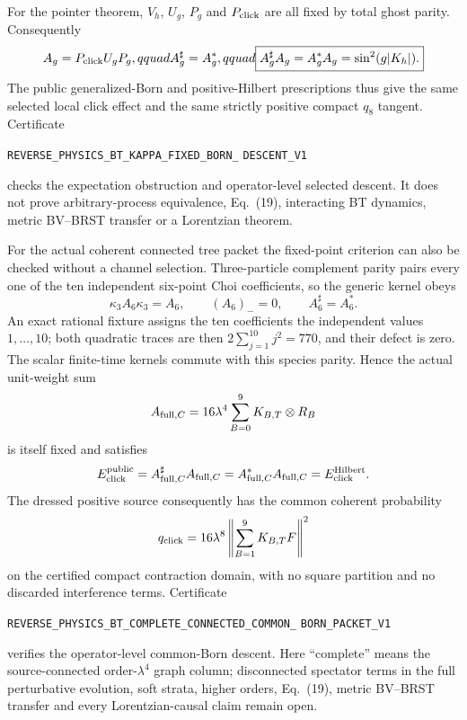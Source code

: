 \documentclass[11pt]{article}
\theoremstyle{definition}
\theoremstyle{remark}
\begin{document}
For the pointer theorem, $V_h$, $U_g$, $P_g$ and $P_{\rm click}$ are all
fixed by total ghost parity.  Consequently
\[
 A_g=P_{\rm click}U_gP_g,qquad A_g^\sharp=A_g^*,qquad
 \boxed{A_g^\sharp A_g=A_g^*A_g=\sin^2(g|K_h|).}
\]
The public generalized-Born and positive-Hilbert prescriptions thus give the
same selected local click effect and the same strictly positive compact
$q_8$ tangent.  Certificate
\par\noindent
\texttt{REVERSE\_PHYSICS\_BT\_KAPPA\_FIXED\_BORN\_}
\allowbreak\texttt{DESCENT\_V1}
\par\noindent
checks the expectation obstruction and operator-level selected descent.  It
does not prove arbitrary-process equivalence, Eq.~(19), interacting BT
dynamics, metric BV--BRST transfer or a Lorentzian theorem.

For the actual coherent connected tree packet the fixed-point criterion can
also be checked without a channel selection.  Three-particle complement
parity pairs every one of the ten independent six-point Choi coefficients,
so the generic kernel obeys
\[
 \kappa_3A_6\kappa_3=A_6,\qquad (A_6)_-=0,
 \qquad A_6^\sharp=A_6^*.
\]
An exact rational fixture assigns the ten coefficients the independent
values $1,\ldots,10$; both quadratic traces are then
$2\sum_{j=1}^{10}j^2=770$, and their defect is zero.  The scalar finite-time
kernels commute with this species parity.  Hence the actual unit-weight sum
\[
 A_{{\rm full},C}=16\lambda^4\sum_{B=0}^{9}K_{B,T}\otimes R_B
\]
is itself fixed and satisfies
\[
 E_{\rm click}^{\rm public}
 =A_{{\rm full},C}^\sharp A_{{\rm full},C}
 =A_{{\rm full},C}^* A_{{\rm full},C}
 =E_{\rm click}^{\rm Hilbert}.
\]
The dressed positive source consequently has the common coherent probability
\[
 q_{\rm click}=16\lambda^8
 \left\|\sum_{B=1}^{9}K_{B,T}F\right\|^2
\]
on the certified compact contraction domain, with no square partition and no
discarded interference terms.  Certificate
\par\noindent
\texttt{REVERSE\_PHYSICS\_BT\_COMPLETE\_CONNECTED\_COMMON\_}
\allowbreak\texttt{BORN\_PACKET\_V1}
\par\noindent
verifies the operator-level common-Born descent.  Here ``complete'' means the
source-connected order-\(\lambda^4\) graph column; disconnected spectator
terms in the full perturbative evolution, soft strata, higher orders,
Eq.~(19), metric BV--BRST transfer and every Lorentzian-causal claim remain
open.
\end{document}
